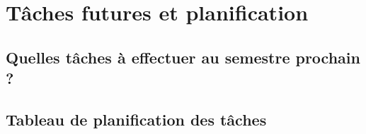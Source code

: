 \chapter{Tâches futures et planification}
\section{Quelles tâches à effectuer au semestre prochain ?}
\section{Tableau de planification des tâches}